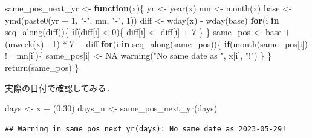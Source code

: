 \documentclass[
]{article}
\newenvironment{Shaded}{\begin{snugshade}}{\end{snugshade}}
\newcommand{\ConstantTok}[1]{\textcolor[rgb]{0.00,0.00,0.00}{#1}}
\newcommand{\ControlFlowTok}[1]{\textcolor[rgb]{0.13,0.29,0.53}{\textbf{#1}}}
\newcommand{\DecValTok}[1]{\textcolor[rgb]{0.00,0.00,0.81}{#1}}
\newcommand{\FunctionTok}[1]{\textcolor[rgb]{0.00,0.00,0.00}{#1}}
\newcommand{\NormalTok}[1]{#1}
\newcommand{\OtherTok}[1]{\textcolor[rgb]{0.56,0.35,0.01}{#1}}
\newcommand{\SpecialCharTok}[1]{\textcolor[rgb]{0.00,0.00,0.00}{#1}}
\newcommand{\StringTok}[1]{\textcolor[rgb]{0.31,0.60,0.02}{#1}}
\begin{document}
\begin{Shaded}
\begin{Highlighting}[]
\NormalTok{same\_pos\_next\_yr }\OtherTok{\textless{}{-}} \ControlFlowTok{function}\NormalTok{(x)\{}
\NormalTok{  yr }\OtherTok{\textless{}{-}} \FunctionTok{year}\NormalTok{(x)}
\NormalTok{  mn }\OtherTok{\textless{}{-}} \FunctionTok{month}\NormalTok{(x)}
\NormalTok{  base }\OtherTok{\textless{}{-}} \FunctionTok{ymd}\NormalTok{(}\FunctionTok{paste0}\NormalTok{(yr }\SpecialCharTok{+} \DecValTok{1}\NormalTok{, }\StringTok{"{-}"}\NormalTok{, mn, }\StringTok{"{-}"}\NormalTok{, }\DecValTok{1}\NormalTok{))}
\NormalTok{  diff }\OtherTok{\textless{}{-}} \FunctionTok{wday}\NormalTok{(x) }\SpecialCharTok{{-}} \FunctionTok{wday}\NormalTok{(base)}
  \ControlFlowTok{for}\NormalTok{(i }\ControlFlowTok{in} \FunctionTok{seq\_along}\NormalTok{(diff))\{}
    \ControlFlowTok{if}\NormalTok{(diff[i] }\SpecialCharTok{\textless{}} \DecValTok{0}\NormalTok{)\{ diff[i] }\OtherTok{\textless{}{-}}\NormalTok{ diff[i] }\SpecialCharTok{+} \DecValTok{7}\NormalTok{ \}}
\NormalTok{  \}}
\NormalTok{  same\_pos }\OtherTok{\textless{}{-}}\NormalTok{ base }\SpecialCharTok{+}\NormalTok{ (}\FunctionTok{mweek}\NormalTok{(x) }\SpecialCharTok{{-}} \DecValTok{1}\NormalTok{) }\SpecialCharTok{*} \DecValTok{7} \SpecialCharTok{+}\NormalTok{ diff}
  \ControlFlowTok{for}\NormalTok{(i }\ControlFlowTok{in} \FunctionTok{seq\_along}\NormalTok{(same\_pos))\{}
    \ControlFlowTok{if}\NormalTok{(}\FunctionTok{month}\NormalTok{(same\_pos[i]) }\SpecialCharTok{!=}\NormalTok{ mn[i])\{}
\NormalTok{      same\_pos[i] }\OtherTok{\textless{}{-}} \ConstantTok{NA}
      \FunctionTok{warning}\NormalTok{(}\StringTok{"No same date as "}\NormalTok{, x[i], }\StringTok{"!"}\NormalTok{)}
\NormalTok{    \}}
\NormalTok{  \}}
  \FunctionTok{return}\NormalTok{(same\_pos)}
\NormalTok{\}}
\end{Highlighting}
\end{Shaded}

実際の日付で確認してみる．

\begin{Shaded}
\begin{Highlighting}[]
\NormalTok{days   }\OtherTok{\textless{}{-}}\NormalTok{ x }\SpecialCharTok{+}\NormalTok{ (}\DecValTok{0}\SpecialCharTok{:}\DecValTok{30}\NormalTok{)}
\NormalTok{days\_n }\OtherTok{\textless{}{-}} \FunctionTok{same\_pos\_next\_yr}\NormalTok{(days)}
\end{Highlighting}
\end{Shaded}

\begin{verbatim}
## Warning in same_pos_next_yr(days): No same date as 2023-05-29!
\end{verbatim}
\end{document}
